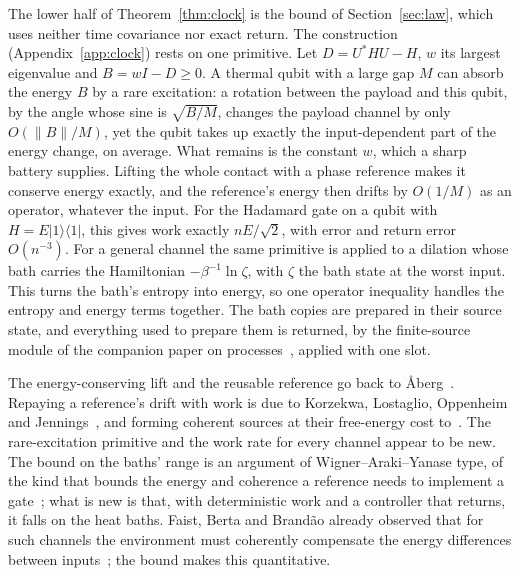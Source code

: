 \documentclass[11pt]{article}
\theoremstyle{definition}
\theoremstyle{remark}
\begin{document}
The lower half of Theorem~\ref{thm:clock} is the bound of Section~\ref{sec:law}, which uses neither time covariance nor exact return. The construction (Appendix~\ref{app:clock}) rests on one primitive. Let $D=U^*HU-H$, $w$ its largest eigenvalue and $B=wI-D\ge0$. A thermal qubit with a large gap $M$ can absorb the energy $B$ by a rare excitation: a rotation between the payload and this qubit, by the angle whose sine is $\sqrt{B/M}$, changes the payload channel by only $O(\|B\|/M)$, yet the qubit takes up exactly the input-dependent part of the energy change, on average. What remains is the constant $w$, which a sharp battery supplies. Lifting the whole contact with a phase reference makes it conserve energy exactly, and the reference's energy then drifts by $O(1/M)$ as an operator, whatever the input. For the Hadamard gate on a qubit with $H=E|1\rangle\langle1|$, this gives work exactly $nE/\sqrt2$, with error and return error $O(n^{-3})$. For a general channel the same primitive is applied to a dilation whose bath carries the Hamiltonian $-\beta^{-1}\ln\zeta$, with $\zeta$ the bath state at the worst input. This turns the bath's entropy into energy, so one operator inequality handles the entropy and energy terms together. The bath copies are prepared in their source state, and everything used to prepare them is returned, by the finite-source module of the companion paper on processes~\cite[Lemma~12]{Answering}, applied with one slot.

The energy-conserving lift and the reusable reference go back to {\AA}berg~\cite{Aberg14}. Repaying a reference's drift with work is due to Korzekwa, Lostaglio, Oppenheim and Jennings~\cite{KLOJ16}, and forming coherent sources at their free-energy cost to~\cite{Brandao13,KLOJ16}. The rare-excitation primitive and the work rate for every channel appear to be new. The bound on the baths' range is an argument of Wigner--Araki--Yanase type, of the kind that bounds the energy and coherence a reference needs to implement a gate~\cite{ChiribellaYangRenner21,TSS20}; what is new is that, with deterministic work and a controller that returns, it falls on the heat baths. Faist, Berta and Brand\~ao already observed that for such channels the environment must coherently compensate the energy differences between inputs~\cite{FBB19}; the bound makes this quantitative.
\end{document}
